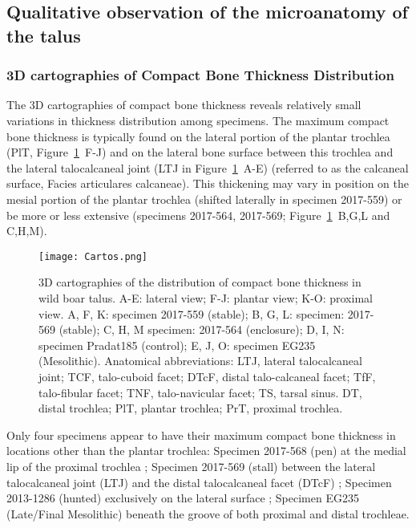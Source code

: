 \documentclass[12pt,a4paper]{article}
\begin{document}
\subsection{Qualitative observation of the microanatomy of the talus}
\subsubsection{3D cartographies of Compact Bone Thickness Distribution}
The 3D cartographies of compact bone thickness reveals relatively small variations in thickness distribution among specimens. The maximum compact bone thickness is typically found on the lateral portion of the plantar trochlea (PlT, Figure~\ref{Cartos}~F-J) and on the lateral bone surface between this trochlea and the lateral talocalcaneal joint (LTJ in Figure~\ref{Cartos}~A-E) 
(referred to as the calcaneal surface, Facies articulares calcaneae). This thickening may vary in position on the mesial portion of the plantar trochlea (shifted laterally in specimen 2017-559) or be more or less extensive (specimens 2017-564, 2017-569; Figure~\ref{Cartos}~B,G,L and C,H,M).

\begin{figure}[H]
	\texttt{[image: Cartos.png]}
	\caption{3D cartographies of the distribution of compact bone thickness in wild boar talus. 
A-E: lateral view; F-J: plantar view; K-O: proximal view. A, F, K: specimen 2017-559 (stable); B, G, L: specimen: 2017-569 (stable); C, H, M specimen: 2017-564 (enclosure); D, I, N: specimen Pradat185 (control); E, J, O: specimen EG235 (Mesolithic). Anatomical abbreviations: LTJ, lateral talocalcaneal joint; TCF, talo-cuboid facet; DTcF, distal talo-calcaneal facet; TfF, talo-fibular facet; TNF, talo-navicular facet; TS, tarsal sinus. DT, distal trochlea; PlT, plantar trochlea; PrT, proximal trochlea.}
	\label{Cartos}
\end{figure}

Only four specimens appear to have their maximum compact bone thickness in locations other than the plantar trochlea: Specimen 2017-568 (pen) at the medial lip of the proximal trochlea ; Specimen 2017-569 (stall) between the lateral talocalcaneal joint (LTJ) and the distal talocalcaneal facet (DTcF) ; Specimen 2013-1286 (hunted) exclusively on the lateral surface ; Specimen EG235 (Late/Final Mesolithic) beneath the groove of both proximal and distal trochleae.
\end{document}
